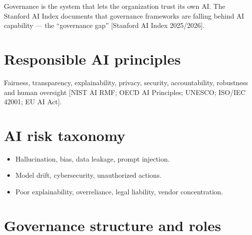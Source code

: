 
Governance is the system that lets the organization trust its own AI. The
Stanford AI Index documents that governance frameworks are falling behind AI
capability — the ``governance gap'' [Stanford AI Index 2025/2026].

\section{Responsible AI principles}

Fairness, transparency, explainability, privacy, security, accountability,
robustness and human oversight [NIST AI RMF; OECD AI Principles; UNESCO;
ISO/IEC 42001; EU AI Act].

\section{AI risk taxonomy}

\begin{itemize}
  \item Hallucination, bias, data leakage, prompt injection.
  \item Model drift, cybersecurity, unauthorized actions.
  \item Poor explainability, overreliance, legal liability, vendor
        concentration.
\end{itemize}

\section{Governance structure and roles}

\begin{center}
  \renewcommand{\arraystretch}{1.45}
\end{center}

